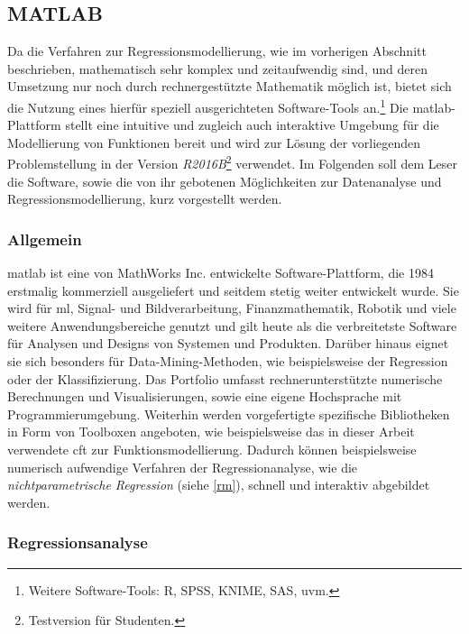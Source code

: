 \subsection{MATLAB}
\label{matlab}

Da die Verfahren zur Regressionsmodellierung, wie im vorherigen Abschnitt beschrieben, mathematisch sehr komplex und zeitaufwendig sind, und deren Umsetzung nur noch durch rechnergestützte Mathematik möglich ist, bietet sich die Nutzung eines hierfür speziell ausgerichteten Software-Tools an.\footnote{Weitere Software-Tools: R, SPSS, KNIME, SAS, uvm.} Die \gls{matlab}-Plattform stellt eine intuitive und zugleich auch interaktive Umgebung für die Modellierung von Funktionen bereit und wird zur Lösung der vorliegenden Problemstellung in der Version \textit{R2016B}\footnote{Testversion für Studenten.} verwendet. Im Folgenden soll dem Leser die Software, sowie die von ihr gebotenen Möglichkeiten zur Datenanalyse und Regressionsmodellierung, kurz vorgestellt werden. 

\subsubsection{Allgemein}
\enlargethispage{\baselineskip}\gls{matlab} ist eine von MathWorks Inc. entwickelte Software-Plattform, die 1984 erstmalig kommerziell ausgeliefert und seitdem stetig weiter entwickelt wurde. Sie wird für \gls{ml}, Signal- und Bildverarbeitung, Finanzmathematik, Robotik und viele weitere Anwendungsbereiche genutzt und gilt heute als die verbreitetste Software für Analysen und Designs von Systemen und Produkten. Darüber hinaus eignet sie sich besonders für Data-Mining-Methoden, wie beispielsweise der Regression oder der Klassifizierung. Das Portfolio umfasst rechnerunterstützte numerische Berechnungen und Visualisierungen, sowie eine eigene Hochsprache mit Programmierumgebung. Weiterhin werden vorgefertigte spezifische Bibliotheken in Form von Toolboxen angeboten, wie beispielsweise das in dieser Arbeit verwendete \gls{cft} zur Funktionsmodellierung. Dadurch können beispielsweise numerisch aufwendige Verfahren der Regressionanalyse, wie die \textit{nichtparametrische Regression} (siehe \vref{rm}), schnell und interaktiv abgebildet werden. 

\subsubsection{Regressionsanalyse}
\label{matra}


